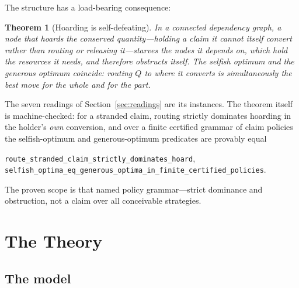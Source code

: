 \documentclass[11pt]{article}
\newtheorem{theorem}{Theorem}
\begin{document}
The structure has a load-bearing consequence:

\begin{theorem}[Hoarding is self-defeating]
\label{thm:hoarding}
In a connected dependency graph, a node that hoards the conserved
quantity---holding a claim it cannot itself convert rather than routing
or releasing it---starves the nodes it depends on, which hold the
resources it needs, and therefore obstructs itself. The selfish optimum
and the generous optimum coincide: routing $Q$ to where it converts is
simultaneously the best move for the whole and for the part.
\end{theorem}

The seven readings of Section~\ref{sec:readings} are its instances.
The theorem itself is machine-checked: for a stranded claim, routing
strictly dominates hoarding in the holder's \emph{own} conversion, and
over a finite certified grammar of claim policies the selfish-optimum
and generous-optimum predicates are provably equal
\begin{center}\small
\texttt{route\_stranded\_claim\_strictly\_dominates\_hoard},\\
\texttt{selfish\_optima\_eq\_generous\_optima\_in\_finite\_certified\_policies}.
\end{center}
\noindent The proven scope is that named policy grammar---strict dominance and
obstruction, not a claim over all conceivable strategies.

\section{The Theory}
\label{sec:theory}

\subsection{The model}
\label{sec:model}
\end{document}
